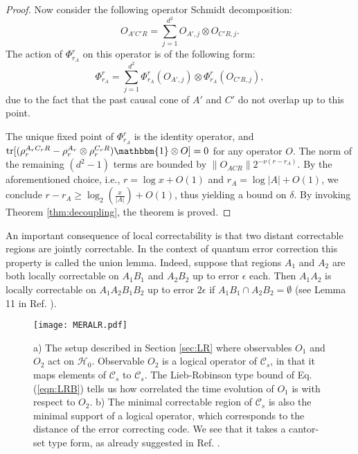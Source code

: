 \documentclass[a4paper,11pt]{article}
\newcommand{\1}{\mathbbm{1}}
\newcommand{\cH}{\mathcal{H}}
\newcommand{\cC}{\mathcal{C}}
\newcommand{\tr}{{\rm tr}}
\begin{document}
\begin{proof}
Now consider the following operator Schmidt decomposition:
\begin{equation}
O_{A'C'R} = \sum_{j=1}^{d^2} O_{A', j}\otimes O_{C'R, j}.
\end{equation}
The action of $\Phi_{r_A}^{r}$ on this operator is of the following form:
\begin{equation}
\Phi_{r_A}^{r} = \sum_{j=1}^{d^2} \Phi_{r_A}^{r}(O_{A',j}) \otimes \Phi_{r_A}^{r}(O_{C'R,j}),
\end{equation}
due to the fact that the past causal cone of $A'$ and $C'$ do not overlap up to this point.

The unique fixed point of $\Phi_{r_A}^r$ is the identity operator, and $\tr[(\rho_r^{A_rC_rR} - \rho_r^{A_r}\otimes \rho_r^{C_rR}) \1\otimes O]=0$ for any operator $O$. The norm of the remaining $(d^2-1)$ terms are bounded by $\|O_{ACR}\|2^{-\nu(r-r_A)}$. By the aforementioned choice, i.e., $r=\log x + O(1)$ and $r_A= \log|A| + O(1)$, we conclude $r-r_A \geq \log_2(\frac{x}{|A|}) + O(1)$, thus yielding a bound on $\delta.$ By invoking Theorem \ref{thm:decoupling}, the theorem is proved.
\end{proof}

An important consequence of local correctability is that two distant correctable regions are jointly correctable. In the context of quantum error correction this property is called the union lemma. Indeed, suppose that regions $A_1$ and $A_2$ are both locally correctable on $A_1B_1$ and $A_2B_2$ up to error $\epsilon$ each. Then $A_1A_2$ is locally correctable on $A_1A_2B_1B_2$ up to error $2\epsilon$ if $A_1B_1\cap A_2B_2=\emptyset$ (see Lemma 11 in Ref. \cite{Flammia2016}).



\begin{figure*}
	\begin{center}
		\texttt{[image: MERALR.pdf]}
	\caption{
      a) The setup described in Section \ref{sec:LR} where observables $O_1$ and $O_2$ act on $\cH_0$. Observable $O_2$ is a logical operator of $\cC_s$, in that it maps elements of $\cC_s$ to $\cC_s$. The Lieb-Robinson type bound of Eq. (\ref{eqn:LRB}) tells us how correlated the time evolution of $O_1$ is with respect to $O_2$.  b) The minimal correctable region of $\cC_s$ is also the minimal support of a logical operator, which corresponds to the distance of the error correcting code. We see that it takes a cantor-set type form, as already suggested in Ref. \cite{Pastawski2016a}. 	}\label{fig:MERA2}
			\end{center}
\end{figure*}
\end{document}
